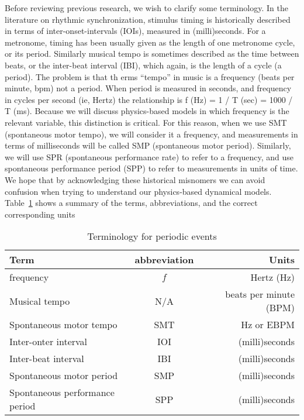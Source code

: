 \documentclass[10pt,letterpaper]{article}
\begin{document}
Before reviewing previous research, we wish to clarify some terminology. In the literature on rhythmic synchronization, stimulus timing is historically described in terms of inter-onset-intervals (IOIs), measured in (milli)seconds. For a metronome, timing has been usually given as the length of one metronome cycle, or its period. Similarly musical tempo is sometimes described as the time between beats, or the inter-beat interval (IBI), which again, is the length of a cycle (a period). The problem is that th erms “tempo” in music is a frequency (beats per minute, bpm) not a period. When period is measured in seconds, and frequency in cycles per second (ie, Hertz) the relationship is f (Hz) = 1 / T (sec) = 1000 / T (ms). Because we will discuss physics-based models in which frequency is the relevant variable, this distinction is critical. For this reason, when we use SMT (spontaneous motor tempo), we will consider it a frequency, and measurements in terms of milliseconds will be called SMP (spontaneous motor period). Similarly, we will use SPR (spontaneous performance rate) to refer to a frequency, and use spontaneous performance period (SPP) to refer to measurements in units of time. We hope that by acknowledging these historical misnomers we can avoid confusion when trying to understand our physics-based dynamical models. Table~\ref{tab:t3_1} shows a summary of the terms, abbreviations, and the correct corresponding units

\begin{table}
    \begin{center}
      \caption{Terminology for periodic events}
      \label{tab:t3_1}
      \begin{tabular}{l|c|r}
        \textbf{Term} & \textbf{abbreviation} & \textbf{Units}\\
        \hline
        frequency & $f$ & Hertz (Hz)\\
        \hline
        Musical tempo & N/A & beats per minute (BPM)\\
        \hline
        Spontaneous motor tempo & SMT & Hz or EBPM\\
        \hline
        Inter-onter interval & IOI & (milli)seconds\\
        \hline
        Inter-beat interval & IBI & (milli)seconds\\
        \hline
        Spontaneous motor period & SMP & (milli)seconds\\
        \hline
        Spontaneous performance period & SPP & (milli)seconds\\
      \end{tabular}
    \end{center}
\end{table}
\end{document}
